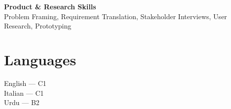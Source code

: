 \documentclass[11pt]{article}
\begin{document}
\vspace{4pt}

\textbf{Product \& Research Skills} \\
{\color{textgray}Problem Framing, Requirement Translation, Stakeholder Interviews, User Research, Prototyping}


\section*{Languages}

English — {\color{textgray}C1} \\
Italian — {\color{textgray}C1} \\
Urdu — {\color{textgray}B2}

\vspace{10pt}

\begin{flushright}
\begin{minipage}[b]{0.16\textwidth}
\end{minipage}\hspace{0.5cm}%
\begin{minipage}[b]{0.18\textwidth}
\raggedleft {}
\end{minipage}
\end{flushright}
\end{document}
